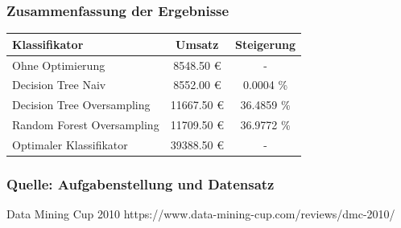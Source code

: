 \documentclass{beamer}
\begin{document}
\begin{frame}
\frametitle{Zusammenfassung der Ergebnisse}
\begin{table}
\begin{tabular}{l c c}
\toprule
\textbf{Klassifikator} & \textbf{Umsatz} & \textbf{Steigerung}\\
\midrule
Ohne Optimierung & 8548.50 \euro{} & - \\
Decision Tree Naiv & 8552.00 \euro{} & 0.0004 \%\\
Decision Tree Oversampling  & 11667.50 \euro{} & 36.4859 \% \\
Random Forest Oversampling  & 11709.50 \euro{} &  36.9772 \% \\
Optimaler Klassifikator  & 39388.50 \euro{} &  -\\
\bottomrule
\end{tabular}
\end{table}
\end{frame}



\begin{frame}
\frametitle{Quelle: Aufgabenstellung und Datensatz}
\footnotesize{
\begin{thebibliography}{99} %
 Data Mining Cup 2010
\newblock https://www.data-mining-cup.com/reviews/dmc-2010/
\end{thebibliography}
}
\end{frame}




\end{document}
